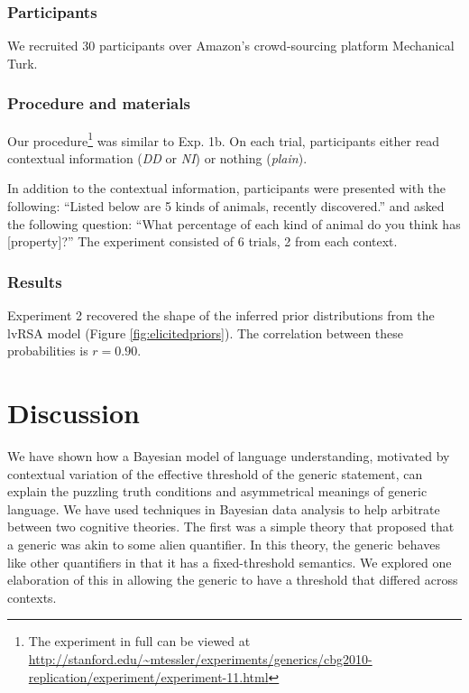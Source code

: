 \documentclass[10pt,letterpaper]{article}
\begin{document}
\subsubsection{Participants}

We recruited 30 participants over Amazon's crowd-sourcing platform Mechanical Turk. 

\subsubsection{Procedure and materials}

Our procedure\footnote{The experiment in full can be viewed at \url{http://stanford.edu/~mtessler/experiments/generics/cbg2010-replication/experiment/experiment-11.html}} was similar to Exp. 1b. On each trial, participants either read contextual information (\emph{DD} or \emph{NI}) or nothing (\emph{plain}). 

In addition to the contextual information, participants were presented with the following: ``Listed below are 5 kinds of animals, recently discovered.'' and asked the following question: ``What percentage of each kind of animal do you think has [property]?'' The experiment consisted of 6 trials, 2 from each context. 

\subsubsection{Results}

Experiment 2 recovered the shape of the inferred prior distributions from the lvRSA model (Figure \ref{fig:elicitedpriors}). The correlation between these probabilities is $r = 0.90$.


\section{Discussion}

We have shown how a Bayesian model of language understanding, motivated by contextual variation of the effective threshold of the generic statement, can explain the puzzling truth conditions and asymmetrical meanings of generic language. We have used techniques in Bayesian data analysis to help arbitrate between two cognitive theories. The first was a simple theory that proposed that a generic was akin to some alien quantifier. In this theory, the generic behaves like other quantifiers in that it has a fixed-threshold semantics. We explored one elaboration of this in allowing the generic to have a threshold that differed across contexts. 
\end{document}
